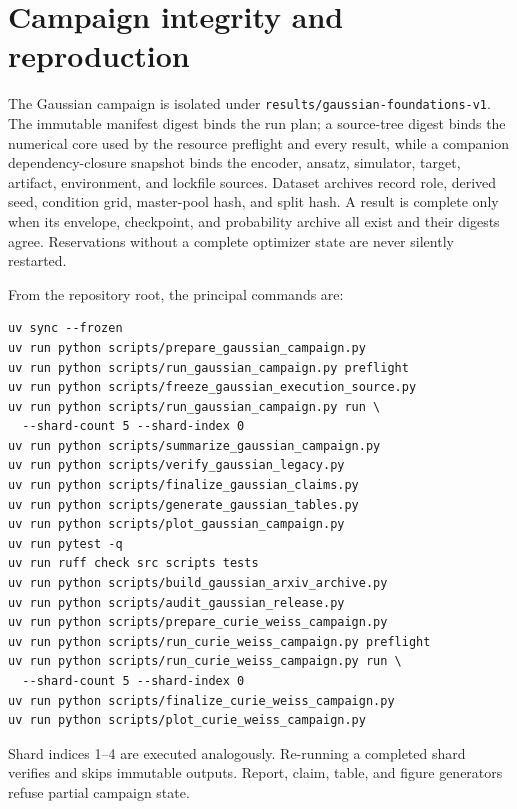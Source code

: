 \section{Campaign integrity and reproduction}
\label{app:reproduction}

The Gaussian campaign is isolated under
\texttt{results/gaussian-foundations-v1}.  The immutable manifest digest binds
the run plan; a source-tree digest binds the numerical core used by the
resource preflight and every result, while a companion dependency-closure
snapshot binds the encoder, ansatz, simulator, target, artifact, environment,
and lockfile sources.  Dataset archives record role,
derived seed, condition grid, master-pool hash, and split hash.  A result is
complete only when its envelope, checkpoint, and probability archive all
exist and their digests agree.  Reservations without a complete optimizer
state are never silently restarted.

From the repository root, the principal commands are:
\begin{verbatim}
uv sync --frozen
uv run python scripts/prepare_gaussian_campaign.py
uv run python scripts/run_gaussian_campaign.py preflight
uv run python scripts/freeze_gaussian_execution_source.py
uv run python scripts/run_gaussian_campaign.py run \
  --shard-count 5 --shard-index 0
uv run python scripts/summarize_gaussian_campaign.py
uv run python scripts/verify_gaussian_legacy.py
uv run python scripts/finalize_gaussian_claims.py
uv run python scripts/generate_gaussian_tables.py
uv run python scripts/plot_gaussian_campaign.py
uv run pytest -q
uv run ruff check src scripts tests
uv run python scripts/build_gaussian_arxiv_archive.py
uv run python scripts/audit_gaussian_release.py
uv run python scripts/prepare_curie_weiss_campaign.py
uv run python scripts/run_curie_weiss_campaign.py preflight
uv run python scripts/run_curie_weiss_campaign.py run \
  --shard-count 5 --shard-index 0
uv run python scripts/finalize_curie_weiss_campaign.py
uv run python scripts/plot_curie_weiss_campaign.py
\end{verbatim}
Shard indices 1--4 are executed analogously.  Re-running a completed shard
verifies and skips immutable outputs.  Report, claim, table, and figure
generators refuse partial campaign state.
